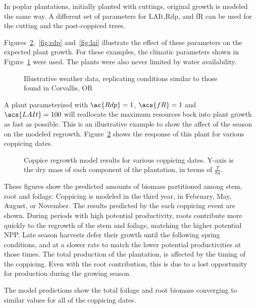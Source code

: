 \documentclass[10pt]{article}
\begin{document}
In poplar plantations, initially planted with cuttings, original
growth is modeled the same way.  A different set of parameters for
\ac{LAIt},\ac{Rdp}, and \acs{fR} can be used for the cutting and the
post-coppiced trees.

Figures~\ref{fig:date},~\ref{fig:rdp} and~\ref{fig:lai} illustrate the
effect of these parameters on the expected plant growth.  For these
examples, the climatic parameters shown in
Figure~\ref{fig:weather} were used.  The plants were also never
limited by water availability.

\begin{figure}
  \centering
  
  \caption{Illustrative weather data, replicating conditions similar
    to those found in Corvallis, OR}
  \label{fig:weather}
\end{figure}

A plant parameterized with $\ac{Rdp}=1$, $\acs{fR}=1$ and
$\acs{LAIt}=100$ will reallocate the maximum resources back into plant
growth as fast as possible.  This is an illustrative example to show
the affect of the season on the modeled regrowth.
Figure~\ref{fig:date} shows the response of this plant for various
coppicing dates.

\begin{figure}
  \centering
  
  \caption{Coppice regrowth model results for various coppicing dates.
    Y-axis is the dry mass of each component of the plantation, in
    terms of $\frac{T}{ha}$.}
  \label{fig:date}
\end{figure}

These figures show the predicted amounts of biomass partitioned among
stem, root and foilage.  Coppicing is modeled in the third year, in
February, May, August, or November.  The results predicted by the each
coppicing event are shown.  During periods with high potential
productivity, roots contribute more quickly to the regrowth of the
stem and foilage, matching the higher potential \ac{NPP}.  Late season
harvests defer their growth until the following spring conditions, and
at a slower rate to match the lower potential productivities at those
times.  The total production of the plantation, is affected by the
timing of the coppicing.  Even with the root contribution, this is due
to a lost opportunity for production during the growing season.

The model predictions show the total foilage and root biomass
converging to similar values for all of the coppicing dates.
\end{document}
